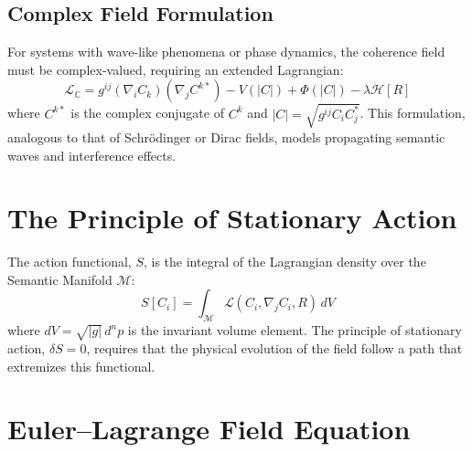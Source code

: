 \subsection{Complex Field Formulation}
For systems with wave-like phenomena or phase dynamics, the coherence field must be complex-valued, requiring an extended Lagrangian:
\begin{equation}
\mathcal{L}_{\mathbb{C}} = g^{ij} (\nabla_i C_k)(\nabla_j C^{k*}) - V(|C|) + \Phi(|C|) - \lambda \mathcal{H}[R]
\end{equation}
where \(C^{k*}\) is the complex conjugate of \(C^k\) and \(|C| = \sqrt{g^{ij} C_i C_j^*}\). This formulation, analogous to that of Schrödinger or Dirac fields, models propagating semantic waves and interference effects.

\section{The Principle of Stationary Action}

The action functional, \(S\), is the integral of the Lagrangian density over the Semantic Manifold \(\mathcal{M}\):
\begin{equation}
S[C_i] = \int_{\mathcal{M}} \mathcal{L}(C_i, \nabla_j C_i, R) \, dV
\end{equation}
where \(dV = \sqrt{|g|} \, d^n p\) is the invariant volume element. The principle of stationary action, \(\delta S = 0\), requires that the physical evolution of the field follow a path that extremizes this functional.

\section{Euler–Lagrange Field Equation}

